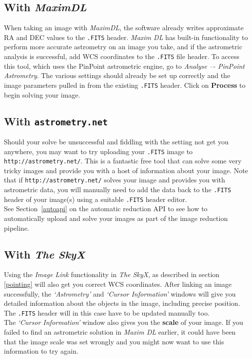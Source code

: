 \documentclass[12pt,twoside,a4paper]{report}
\begin{document}
\subsection{With \emph{MaximDL}}
When taking an image with \emph{MaximDL}, the software already writes approximate RA and DEC values to the {\tt .FITS} header. \emph{Maxim DL} has built-in functionality to perform more accurate astrometry on an image you take, and if the astrometric analysis is successful, add WCS coordinates to the {\tt .FITS} file header. To access this tool, which uses the PinPoint astrometric engine, go to \emph{Analyse –- PinPoint Astrometry}. The various settings should already be set up correctly and the image parameters pulled in from the existing {\tt .FITS} header. Click on \textbf{Process} to begin solving your image.\\

\subsection{With {\tt astrometry.net}}
Should your solve be unsuccessful and fiddling with the setting not get you anywhere, you may want to try uploading your {\tt .FITS} image to {\tt http://astrometry.net/}. This is a fantastic free tool that can solve some very tricky images and provide you with a host of information about your image. Note that if {\tt http://astrometry.net/} solves your image and provides you with astrometric data, you will manually need to add the data back to the {\tt .FITS} header of your image(s) using a suitable {\tt .FITS} header editor.\\

See Section~\ref{autoapi} on the automatic reduction API to see how to automatically upload and solve your images as part of the image reduction pipeline.

\subsection{With \emph{The SkyX}}
Using the \emph{Image Link} functionality in \emph{The SkyX}, as described in section \ref{pointing} will also get you correct WCS coordinates. After linking an image successfully, the \emph{`Astrometry'} and \emph{`Cursor Information'} windows will give you detailed information about the objects in the image, including precise position. The {\tt .FITS} header will in this case have to be updated manually too.\\

The \emph{`Cursor Information'} window also gives you the \textbf{scale} of your image. If you failed to find an astrometric solution in \emph{Maxim DL} earlier, it could have been that the image scale was set wrongly and you might now want to use this information to try again.
\end{document}
